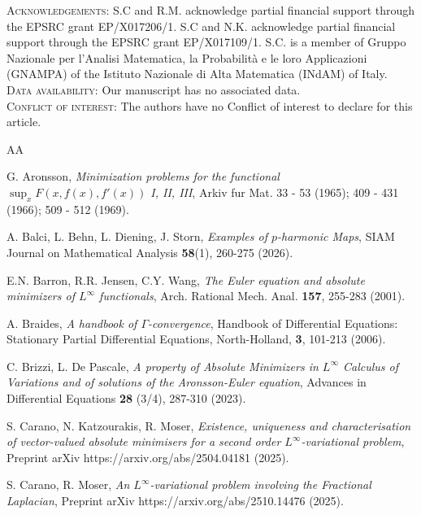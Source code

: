 \documentclass[a4paper,11pt]{article}
\numberwithin{equation}{section}
\theoremstyle{definition}
\begin{document}
\textsc{Acknowledgements:} S.C and R.M. acknowledge partial financial support through the EPSRC grant EP/X017206/1. S.C and N.K. acknowledge partial financial support through the EPSRC grant EP/X017109/1. 
S.C. is a member of Gruppo Nazionale per
l’Analisi Matematica, la Probabilità e le loro Applicazioni (GNAMPA) of the Istituto Nazionale
di Alta Matematica (INdAM) of Italy.\\

\textsc{Data availability}: Our manuscript has no associated data.\\

\textsc{Conflict of interest}: The authors have no Conflict of interest to declare for this article.

\begin{thebibliography}{AA} 

G. Aronsson, {\it Minimization problems for the functional $\sup_xF(x, f(x), f'(x))$ I, II, III}, Arkiv
fur Mat. 33 - 53 (1965); 409 - 431 (1966); 509 - 512 (1969).

{A. Balci, L. Behn, L. Diening, J. Storn,} {\it {Examples of \({p}\)-harmonic Maps}}, {SIAM Journal on Mathematical Analysis} {\bf 58}(1), 260-275 (2026).

E.N. Barron, R.R. Jensen, C.Y. Wang, {\it The Euler equation and absolute minimizers of $L^\infty$ functionals}, Arch. Rational
Mech. Anal. {\bf 157}, 255-283 (2001).

A. Braides, {\it A handbook of $\Gamma$-convergence},
Handbook of Differential Equations: Stationary Partial Differential Equations,
North-Holland,
{\bf 3}, 101-213 (2006).

 C. Brizzi, L. De Pascale, \emph{A property of Absolute Minimizers in $ L^{\infty}$  Calculus of Variations and of solutions of the Aronsson-Euler equation}, Advances in Differential Equations {\bf 28} (3/4), 287-310 (2023).

S. Carano, N. Katzourakis, R. Moser, \emph{
Existence, uniqueness and characterisation of vector-valued absolute minimisers for a second order $L^\infty$-variational problem}, Preprint arXiv https://arxiv.org/abs/2504.04181 (2025).

S. Carano, R. Moser, \emph{
An $L^\infty$-variational problem involving the Fractional Laplacian}, Preprint arXiv https://arxiv.org/abs/2510.14476 (2025).



\end{thebibliography}
\end{document}
